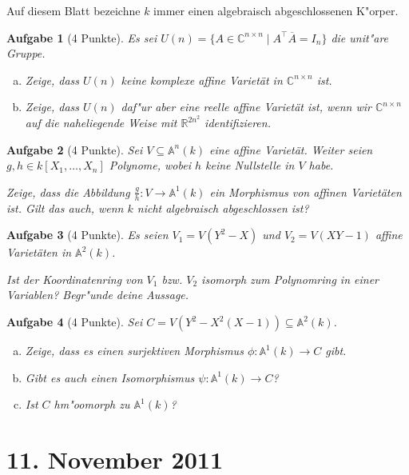 \documentclass[a4paper, 12pt, numbers=noendperiod, chapterprefix=true, headsepline]{scrbook}
\theoremstyle{break}
\newtheorem{Aufg}{Aufgabe}
\theoremstyle{nonumberbreak}
\theoremstyle{nonumberplain}
\newcommand{\R}{\mathbb{R}}
\newcommand{\C}{\mathbb{C}}
\newcommand{\A}{\mathbb{A}}
\begin{document}
Auf diesem Blatt bezeichne $k$ immer einen algebraisch abgeschlossenen K"orper.

\begin{Aufg}[4 Punkte]
Es sei $U(n) = \{ A \in \C^{n \times n} \mid A^\top \overline A = I_n \}$ die unit"are Gruppe.
\begin{enumerate}[a)]
	\item Zeige, dass $U(n)$ keine komplexe affine Variet\"at in $\C^{n \times n}$ ist.
	\item Zeige, dass $U(n)$ daf"ur aber eine reelle affine Variet\"at ist, wenn wir $\C^{n \times n}$ auf die naheliegende Weise mit $\R^{2n^2}$ identifizieren.
\end{enumerate}\end{Aufg}

\begin{Aufg}[4 Punkte]
Sei $V \subseteq \A^n(k)$ eine affine Variet\"at. Weiter seien $g,h \in k[X_1, \ldots, X_n]$ Polynome, wobei $h$ keine Nullstelle in $V$ habe. 

Zeige, dass die Abbildung $\frac{g}{h} : V \to \A^1(k)$ ein Morphismus von affinen Variet\"aten ist. Gilt das auch, wenn $k$ nicht algebraisch abgeschlossen ist?
\end{Aufg}

\begin{Aufg}[4 Punkte]
Es seien $V_1 = V(Y^2-X)$ und $V_2 = V(XY-1)$ affine Variet\"aten in $\A^2(k)$. 

Ist der Koordinatenring von $V_1$ bzw. $V_2$ isomorph zum Polynomring in einer Variablen? Begr"unde deine Aussage.
\end{Aufg}

\begin{Aufg}[4 Punkte]
Sei $C = V(Y^2 - X^2(X-1))\subseteq \A^2(k)$.
\begin{enumerate}[a)]
	\item Zeige, dass es einen surjektiven Morphismus $\phi:\A^1(k)\to C$ gibt.
	\item Gibt es auch einen Isomorphismus $\psi:\A^1(k)\to C$?
	\item Ist $C$ hm"oomorph zu $\A^1(k)$?
\end{enumerate}\end{Aufg}

\newpage
\section{11. November 2011}
\setcounter{Aufg}{0}
\setcounter{Loes}{1}
\end{document}
